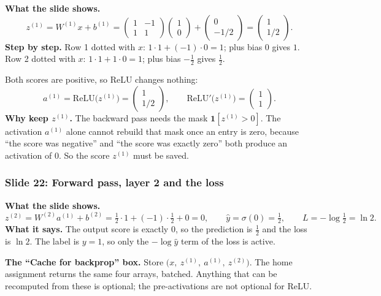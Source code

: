\textbf{What the slide shows.}
\[
z^{(1)} = W^{(1)}x+b^{(1)} = \begin{pmatrix}1&-1\\1&1\end{pmatrix}\begin{pmatrix}1\\0\end{pmatrix}+\begin{pmatrix}0\\-1/2\end{pmatrix} = \begin{pmatrix}1\\1/2\end{pmatrix}.
\]
\textbf{Step by step.} Row 1 dotted with $x$: $1\cdot1+(-1)\cdot0=1$; plus bias $0$ gives $1$. Row 2 dotted with $x$: $1\cdot1+1\cdot0=1$; plus bias $-\tfrac12$ gives $\tfrac12$.

Both scores are positive, so ReLU changes nothing:
\[
a^{(1)} = \text{ReLU}\big(z^{(1)}\big)=\begin{pmatrix}1\\1/2\end{pmatrix}, \qquad \text{ReLU}'\big(z^{(1)}\big)=\begin{pmatrix}1\\1\end{pmatrix}.
\]
\textbf{Why keep $z^{(1)}$.} The backward pass needs the mask $\mathbf{1}[z^{(1)}>0]$. The activation $a^{(1)}$ alone cannot rebuild that mask once an entry is zero, because ``the score was negative'' and ``the score was exactly zero'' both produce an activation of $0$. So the score $z^{(1)}$ must be saved.

\subsubsection{Slide 22: Forward pass, layer 2 and the loss}

\textbf{What the slide shows.}
\[
z^{(2)} = W^{(2)}a^{(1)}+b^{(2)} = \tfrac12\cdot1 + (-1)\cdot\tfrac12 + 0 = 0, \qquad \hat{y}=\sigma(0)=\tfrac12, \qquad L=-\log\tfrac12=\ln2 .
\]
\textbf{What it says.} The output score is exactly $0$, so the prediction is $\tfrac12$ and the loss is $\ln 2$. The label is $y=1$, so only the $-\log\hat{y}$ term of the loss is active.

\textbf{The ``Cache for backprop'' box.} Store $\big(x,\ z^{(1)},\ a^{(1)},\ z^{(2)}\big)$. The home assignment returns the same four arrays, batched. Anything that can be recomputed from these is optional; the pre-activations are not optional for ReLU.


